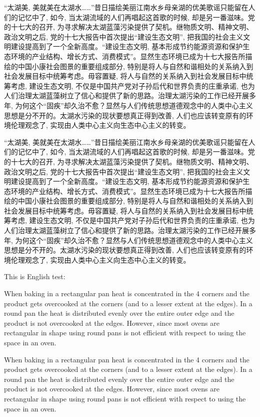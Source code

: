 “太湖美, 美就美在太湖水……”昔日描绘美丽江南水乡母亲湖的优美歌谣只能留在人们的记忆中了, 如今, 当太湖流域的人们再唱起这首歌的时候, 却是另一番滋味。党的十七大的召开, 为寻求解决太湖蓝藻污染提供了契机。继物质文明、精神文明、政治文明之后, 党的十七大报告中首次提出“建设生态文明”, 把我国的社会主义文明建设提高到了一个全新高度。“建设生态文明, 基本形成节约能源资源和保护生态环境的产业结构、增长方式、消费模式”。显然生态环境已成为十七大报告所描绘的中国小康社会图景的重要组成部分, 特别是将人与自然和谐相处的关系纳入到社会发展目标中统筹考虑。毋容置疑, 将人与自然的关系纳入到社会发展目标中统筹考虑, 建设生态文明, 不仅是中国共产党对子孙后代和世界负责的庄重承诺, 也为人们治理太湖蓝藻树立了信心和提供了新的思路。治理太湖污染的工作已经开展多年, 为何这个“固疾”却久治不愈？显然与人们传统思想道德观念中的人类中心主义思想是分不开的。太湖水污染的现状要想真正得到改善, 人们也应该转变原有的环境伦理观念了, 实现由人类中心主义向生态中心主义的转变。

“太湖美, 美就美在太湖水……”昔日描绘美丽江南水乡母亲湖的优美歌谣只能留在人们的记忆中了, 如今, 当太湖流域的人们再唱起这首歌的时候, 却是另一番滋味。党的十七大的召开, 为寻求解决太湖蓝藻污染提供了契机。继物质文明、精神文明、政治文明之后, 党的十七大报告中首次提出“建设生态文明”, 把我国的社会主义文明建设提高到了一个全新高度。“建设生态文明, 基本形成节约能源资源和保护生态环境的产业结构、增长方式、消费模式”。显然生态环境已成为十七大报告所描绘的中国小康社会图景的重要组成部分, 特别是将人与自然和谐相处的关系纳入到社会发展目标中统筹考虑。毋容置疑, 将人与自然的关系纳入到社会发展目标中统筹考虑, 建设生态文明, 不仅是中国共产党对子孙后代和世界负责的庄重承诺, 也为人们治理太湖蓝藻树立了信心和提供了新的思路。治理太湖污染的工作已经开展多年, 为何这个“固疾”却久治不愈？显然与人们传统思想道德观念中的人类中心主义思想是分不开的。太湖水污染的现状要想真正得到改善, 人们也应该转变原有的环境伦理观念了, 实现由人类中心主义向生态中心主义的转变。

\noindent
This is English test:

When baking in a rectangular pan heat is concentrated in the 4 corners and the product gets overcooked at the corners (and to a lesser extent at the edges). In a round pan the heat is distributed evenly over the entire outer edge and the product is not overcooked at the edges. However, since most ovens are rectangular in shape using round pans is not efficient with respect to using the space in an oven.

\sf
When baking in a rectangular pan heat is concentrated in the 4 corners and the product gets overcooked at the corners (and to a lesser extent at the edges). In a round pan the heat is distributed evenly over the entire outer edge and the product is not overcooked at the edges. However, since most ovens are rectangular in shape using round pans is not efficient with respect to using the space in an oven.

